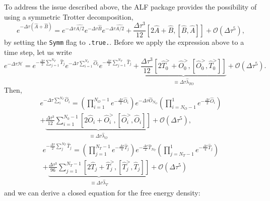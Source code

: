 To address the issue described above, the ALF package provides the possibility of using a symmetric Trotter decomposition,
\begin{equation}
	e^{ -\Delta \tau \left( \hat{A} + \hat{B} \right)  }  =  e^{ -\Delta \tau \hat{A/2}}  e^{ -\Delta \tau  \hat{B}  }   e^{ -\Delta \tau \hat{A/2}}  +  \frac{\Delta  \tau^3}{12} \left[ 2\hat{A} + \hat{B}, \left[\hat{B}, \hat{A} \right]\right] + \mathcal{O} \left (\Delta \tau ^5 \right),
\end{equation}
by setting the \texttt{Symm}  flag to \texttt{.true.}.
Before we apply the expression above to a time step, let us write
\begin{equation}
	e^{-\Delta \tau \mathcal{H}}    =       e^{-\frac{\Delta \tau}{2} \sum_{j=1}^{N_T} \hat{T}_j } e^{-\Delta \tau \sum_{i=1}^{N_I} \hat{O}_i } e^{-\frac{\Delta \tau}{2} \sum_{j=1}^{N_T} \hat{T}_j }   
	 +  \underbrace{\frac{\Delta \tau ^3}{12}   \left[ 2\hat{T}^{>}_0 + \hat{O}^{>}_0, \left[\hat{O}^{>}_{0}, \hat{T}^{>}_0 \right]\right] }_{\equiv \Delta \tau \hat{\lambda}_{TO}}   + \mathcal{O}\left(  \Delta \tau^5 \right).
\end{equation}
Then,
\begin{multline}
 e^{-\Delta \tau \sum_{i}^{N_I} \hat{O}_i }  =  \left(\prod_{i=1}^{N_O-1} e^{-\frac{\Delta \tau}{2} \hat{O}_i } \right)    e^{-\Delta \tau \hat{O}_{N_O} }    
   \left(  \prod_{i=N_O-1}^{1} e^{-\frac{\Delta \tau}{2} \hat{O}_i } \right)   \\
  + \underbrace{\frac{\Delta \tau ^3}{12}  \sum_{i=1}^{N_0-1} \left[ 2\hat{O}_i + \hat{O}^{>}_i, \left[\hat{O}^{>}_{i}, \hat{O}_i \right]\right] }_{\equiv \Delta \tau \hat{\lambda}_{O}}    + \mathcal{O}\left(  \Delta  \tau^5 \right), 
\end{multline}
\begin{multline}
 e^{- \frac{\Delta \tau}{2} \sum_{j}^{N_T} \hat{T}_j }  = \left(\prod_{j=1}^{N_T-1} e^{-\frac{\Delta \tau}{4} \hat{T}_j } \right)    e^{-\frac{\Delta \tau}{2} \hat{T}_{N_T} }    
   \left(  \prod_{j=N_T-1}^{1} e^{-\frac{\Delta \tau}{4} \hat{T}_j } \right)  \\
  + \underbrace{\frac{\Delta \tau ^3}{96}  \sum_{j=1}^{N_T-1} \left[ 2\hat{T}_j + \hat{T}^{>}_j, \left[\hat{T}^{>}_{j}, \hat{T}_j \right]\right] }_{\equiv \Delta \tau \hat{\lambda}_{T}}    + \mathcal{O}\left(  \Delta  \tau^5 \right) 
\end{multline}
and we can derive  a  closed equation  for  the free energy density:
